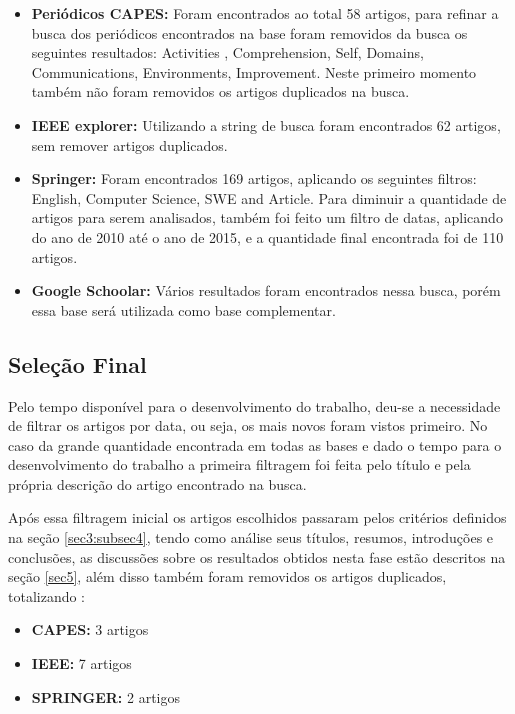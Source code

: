 \documentclass[12pt]{article}
\begin{document}
 \begin{itemize}
   \item  \textbf{Periódicos CAPES:} Foram encontrados ao total 58 artigos, para refinar a busca dos periódicos encontrados na base foram removidos da busca os seguintes resultados: Activities , Comprehension, Self, Domains, Communications, Environments, Improvement. Neste primeiro momento também não foram removidos os artigos duplicados na busca.
   \item  \textbf{IEEE explorer:} Utilizando a string de busca foram encontrados 62 artigos, sem remover artigos duplicados.
   \item  \textbf{Springer:} Foram encontrados 169 artigos, aplicando os seguintes filtros: English, Computer Science, SWE and Article. Para diminuir a quantidade de artigos para serem analisados, também foi feito um filtro de datas, aplicando do ano de 2010 até o ano de 2015, e a quantidade final encontrada foi de 110 artigos.
   \item  \textbf{Google Schoolar:} Vários resultados foram encontrados nessa busca, porém essa base será utilizada como base complementar.
 \end{itemize}

\subsection{Seleção Final} \label{sec4:subsec3}

Pelo tempo disponível para o desenvolvimento do trabalho, deu-se a necessidade de filtrar os artigos por data, ou seja, os mais novos foram vistos primeiro. No caso da grande quantidade encontrada em todas as bases e dado o tempo para o desenvolvimento do trabalho a primeira filtragem foi feita pelo título e pela própria descrição do artigo encontrado na busca.

Após essa filtragem inicial os artigos escolhidos passaram pelos critérios definidos na seção \ref{sec3:subsec4}, tendo como análise seus títulos, resumos, introduções e conclusões, as discussões sobre os resultados obtidos nesta fase estão descritos na seção \ref{sec5}, além disso também foram removidos os artigos duplicados, totalizando :

\begin{itemize}
  \item \textbf{CAPES:} 3 artigos
    \item \textbf{IEEE:} 7 artigos
    \item \textbf{SPRINGER:} 2 artigos
\end{itemize}
\end{document}
